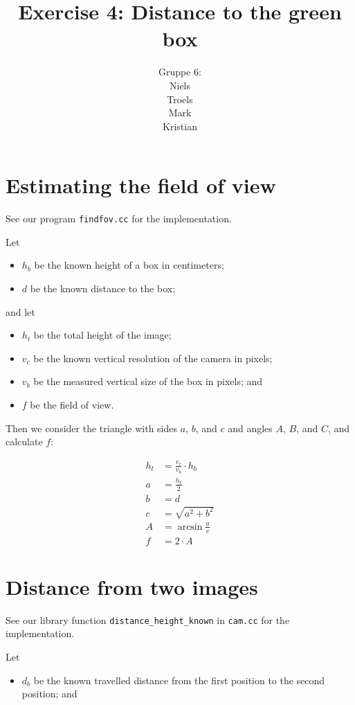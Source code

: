 \documentclass[a4paper,12pt]{article}
\title{Exercise 4: Distance to the green box}
\author{Gruppe 6:\\Niels\\Troels\\Mark\\Kristian}
\begin{document}
\maketitle

\section{Estimating the field of view}

See our program \texttt{findfov.cc} for the implementation.

Let
\begin{itemize}
\item $h_b$ be the known height of a box in centimeters;
\item $d$ be the known distance to the box;
\end{itemize}

and let
\begin{itemize}
\item $h_t$ be the total height of the image;
\item $v_c$ be the known vertical resolution of the camera in pixels;
\item $v_b$ be the measured vertical size of the box in pixels; and
\item $f$ be the field of view.
\end{itemize}

Then we consider the triangle with sides $a$, $b$, and $c$ and angles $A$, $B$,
and $C$, and calculate $f$:

\begin{align*}
  h_t &= \frac{v_c}{v_b} \cdot h_b\\
  a &= \frac{h_t}{2}\\
  b &= d\\
  c &= \sqrt{a^2 + b^2}\\
  A &= \arcsin \frac{a}{c}\\
  f &= 2 \cdot A
\end{align*}


\section{Distance from two images}

See our library function \texttt{distance_height_known} in \texttt{cam.cc} for
the implementation.

Let

\begin{itemize}
\item $d_b$ be the known travelled distance from the first position to the
second position; and
\end{itemize}
\end{document}

